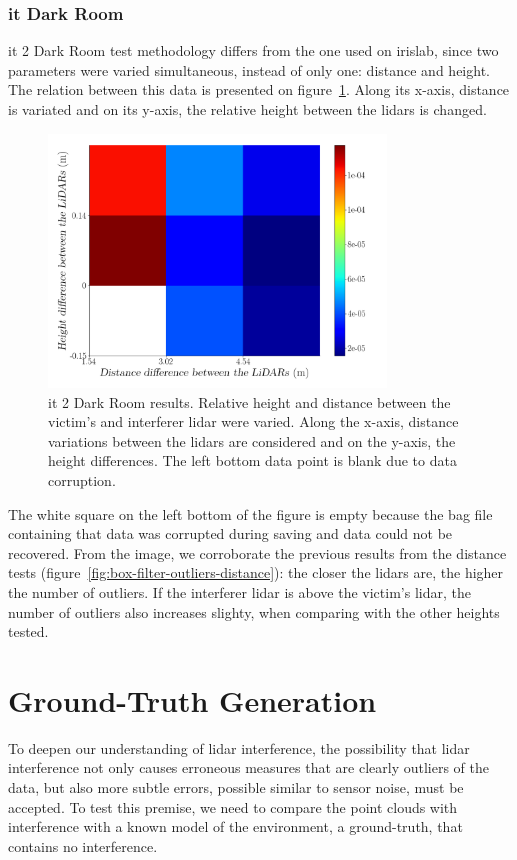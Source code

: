 \subsubsection{\ac{it} Dark Room}
\ac{it} 2 Dark Room test methodology differs from the one used on \ac{irislab}, since two parameters were varied simultaneous, instead of only one: distance and height. The relation between this data is presented on figure~\ref{fig:box-filter-outliers-it2}. Along its x-axis, distance is variated and on its y-axis, the relative height between the \acp{lidar} is changed.

\begin{figure}[!ht]
	\centering
	\includegraphics[width=0.8\textwidth]{img/lidar-interference/box-filtering/interference-box-filter-outliers-it2.png}
	\caption{\ac{it} 2 Dark Room results. Relative height and distance between the victim's and interferer \ac{lidar} were varied. Along the x-axis, distance variations between the \acp{lidar} are considered and on the y-axis, the height differences. The left bottom data point is blank due to data corruption.}
	\label{fig:box-filter-outliers-it2}
\end{figure}

The white square on the left bottom of the figure is empty because the bag file containing that data was corrupted during saving and data could not be recovered. From the image, we corroborate the previous results from the distance tests (figure~\ref{fig:box-filter-outliers-distance}): the closer the \acp{lidar} are, the higher the number of outliers. If the interferer \ac{lidar} is above the victim's \ac{lidar}, the number of outliers also increases slighty, when comparing with the other heights tested.

\section{Ground-Truth Generation}
\label{sec:lidar-interference:ground-truth}
To deepen our understanding of \ac{lidar} interference, the possibility that \ac{lidar} interference not only causes erroneous measures that are clearly outliers of the data, but also more subtle errors, possible similar to sensor noise, must be accepted. To test this premise, we need to compare the point clouds with interference with a known model of the environment, a ground-truth, that contains no interference.  


